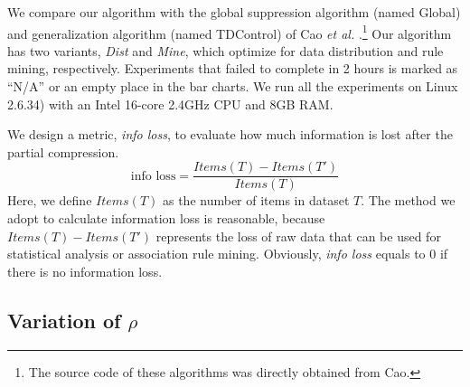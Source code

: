 We compare our algorithm with the
global suppression algorithm (named Global) and generalization algorithm
(named TDControl) of
Cao {\em et al.} \cite{Cao:2010:rho}.\footnote{The source code of these
algorithms was directly obtained from Cao.}
Our algorithm has two variants, {\em Dist} and {\em Mine}, which optimize
for data distribution and rule mining, respectively.
Experiments that failed to complete in 2 hours is marked
as ``N/A'' or an empty place in the bar charts.
We run all the experiments on Linux 2.6.34)
with an Intel 16-core 2.4GHz CPU and 8GB RAM.

We design a metric, {\em info loss}, to evaluate how much information is lost after the partial compression.
\[\text{info loss} = \frac{{Items(T) - Items(T')}}{{Items(T)}}\]
Here, we define $Items(T)$ as the number of items in dataset $T$.
The method we adopt to calculate information loss is reasonable,
because ${Items(T) - Items(T')}$ represents the loss of raw data that
can be used for statistical analysis or association rule mining.
Obviously, {\em info loss} equals to 0 if there is no information loss.

\subsection{Variation of $\rho$}

